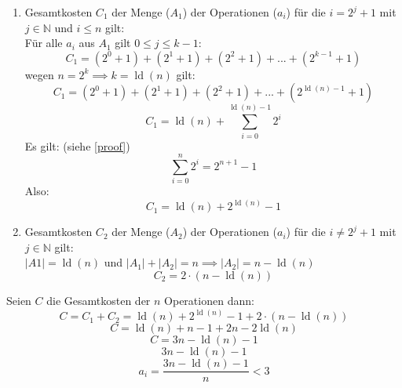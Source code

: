 \documentclass{article}
\begin{document}
\begin{enumerate}

\item  Gesamtkosten $C_1$ der Menge ($A_1$) der Operationen ($a_i$)  für die $i=2^j+1$ mit $j \in \mathbb{N}$ und $i\leq n$ gilt:\\
Für alle $a_i$ aus $A_1$ gilt $ 0 \leq j \leq k-1$:
\begin{equation}
C_1=(2^0+1)+(2^1+1)+(2^2+1)+...+(2^{k-1}+1)
\end{equation}
wegen $n=2^k \implies k=\operatorname{ld}(n)$ gilt:
\begin{equation}
C_1=(2^0+1)+(2^1+1)+(2^2+1)+...+(2^{\operatorname{ld}(n)-1}+1)
\end{equation}
\begin{equation}
C_1={\operatorname{ld}(n)}+\sum_{i=0}^{\operatorname{ld}(n)-1} 2^{i}
\end{equation}
Es gilt: (siehe \ref{proof})
\begin{equation}
\sum_{i=0}^{n} 2^{i}=2^{n+1}-1
\end{equation}
Also:\\
\begin{equation}
C_1={\operatorname{ld}(n)}+2^{\operatorname{ld}(n)}-1
\end{equation}
\item Gesamtkosten $C_2$ der Menge ($A_2$) der Operationen ($a_i$) für die $i\neq2^j+1$ mit $j \in \mathbb{N}$ gilt:\\
$|A1|={\operatorname{ld}(n)}$ und $|A_1|+|A_2|=n \implies |A_2|=n-{\operatorname{ld}(n)} $
\begin{equation}
C_2=2 \cdot ({n-\operatorname{ld}(n)})
\end{equation}
\end{enumerate}
Seien $C$ die Gesamtkosten der $n$ Operationen dann:
\begin{equation}
C=C_1+C_2={\operatorname{ld}(n)}+2^{\operatorname{ld}(n)}-1+2 \cdot ({n-\operatorname{ld}(n)})
\end{equation}
\begin{equation}
C={\operatorname{ld}(n)}+n-1+2 n-2{\operatorname{ld}(n)}
\end{equation}
\begin{equation}
C=3n-{\operatorname{ld}(n)}-1
\end{equation}
\begin{equation}
3n-{\operatorname{ld}(n)}-1
\end{equation}
\begin{equation}
a_i=\frac{3n-{\operatorname{ld}(n)}-1}{n} < 3
\end{equation}
\end{document}
